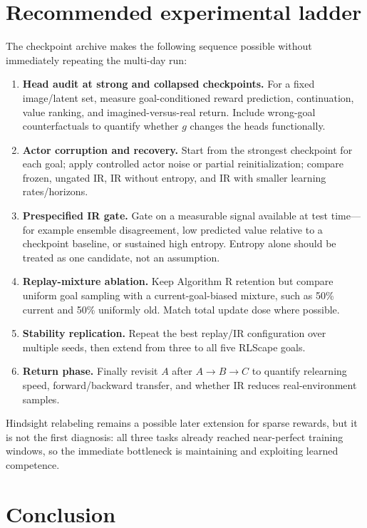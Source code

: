\documentclass[10pt]{article}
\begin{document}
\section{Recommended experimental ladder}

The checkpoint archive makes the following sequence possible without immediately repeating the multi-day run:

\begin{enumerate}
  \item \textbf{Head audit at strong and collapsed checkpoints.} For a fixed image/latent set, measure goal-conditioned reward prediction, continuation, value ranking, and imagined-versus-real return. Include wrong-goal counterfactuals to quantify whether $g$ changes the heads functionally.
  \item \textbf{Actor corruption and recovery.} Start from the strongest checkpoint for each goal; apply controlled actor noise or partial reinitialization; compare frozen, ungated IR, IR without entropy, and IR with smaller learning rates/horizons.
  \item \textbf{Prespecified IR gate.} Gate on a measurable signal available at test time---for example ensemble disagreement, low predicted value relative to a checkpoint baseline, or sustained high entropy. Entropy alone should be treated as one candidate, not an assumption.
  \item \textbf{Replay-mixture ablation.} Keep Algorithm R retention but compare uniform goal sampling with a current-goal-biased mixture, such as 50\% current and 50\% uniformly old. Match total update dose where possible.
  \item \textbf{Stability replication.} Repeat the best replay/IR configuration over multiple seeds, then extend from three to all five RLScape goals.
  \item \textbf{Return phase.} Finally revisit $A$ after $A\rightarrow B\rightarrow C$ to quantify relearning speed, forward/backward transfer, and whether IR reduces real-environment samples.
\end{enumerate}

Hindsight relabeling remains a possible later extension for sparse rewards, but it is not the first diagnosis: all three tasks already reached near-perfect training windows, so the immediate bottleneck is maintaining and exploiting learned competence.

\section{Conclusion}
\end{document}
